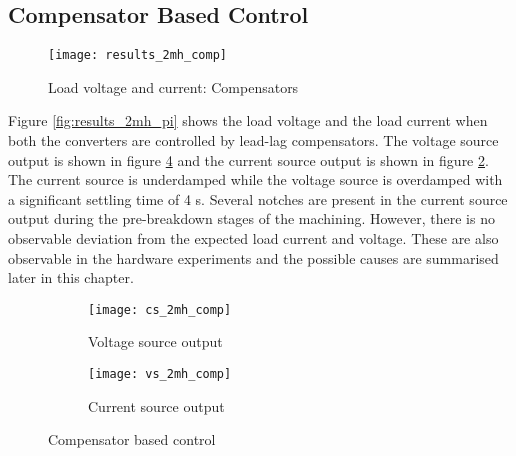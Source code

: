 \subsection{Compensator Based Control}
	\begin{figure}[H]
		\centering
		\texttt{[image: results\_2mh\_comp]}
		\caption{Load voltage and current: Compensators}
		\label{fig:results_2mh_comp}
	\end{figure}
	Figure \ref{fig:results_2mh_pi} shows the load voltage and the load current when both the converters are controlled by lead-lag compensators. The voltage source output is shown in figure \ref{fig:vs_2mh_comp} and the current source output is shown in figure \ref{fig:cs_2mh_comp}. The current source is underdamped while the voltage source is overdamped with a significant settling time of 4 s. Several notches are present in the current source output during the pre-breakdown stages of the machining. However, there is no observable deviation from the expected load current and voltage. These are also observable in the hardware experiments and the possible causes are summarised later in this chapter.
	\begin{figure}[H]
		\centering
		\begin{subfigure}{0.49\linewidth}
			\texttt{[image: cs\_2mh\_comp]}
			\caption{Voltage source output}
			\label{fig:cs_2mh_comp}
		\end{subfigure}
		\begin{subfigure}{0.49\linewidth}
			\texttt{[image: vs\_2mh\_comp]}
			\caption{Current source output}
			\label{fig:vs_2mh_comp}
		\end{subfigure}
		\caption{Compensator based control}
	\end{figure}
	
